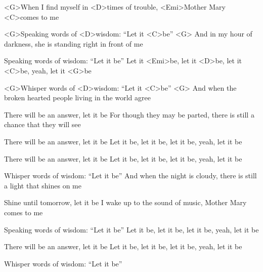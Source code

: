 

\zs
<G>When I find myself in <D>times of trouble,
<Emi>Mother Mary <C>comes to me

<G>Speaking words of <D>wisdom: ``Let it <C>be'' <G>
\ks
\zs
And in my hour of darkness,
she is standing right in front of me

Speaking words of wisdom: ``Let it be''
\ks
\zr
Let it <Emi>be, let it <D>be, let it <C>be, yeah, let it <G>be

<G>Whisper words of <D>wisdom: ``Let it <C>be'' <G>
\kr
\zs
And when the broken hearted people
living in the world agree

There will be an answer, let it be
\ks
\zs
For though they may be parted,
there is still a chance that they will see

There will be an answer, let it be
\ks
\zr
Let it be, let it be, let it be, yeah, let it be

There will be an answer, let it be
\kr
\zr
Let it be, let it be, let it be, yeah, let it be

Whisper words of wisdom: ``Let it be''
\kr
\zs
And when the night is cloudy,
there is still a light that shines on me

Shine until tomorrow, let it be
\ks
\zs
I wake up to the sound of music,
Mother Mary comes to me

Speaking words of wisdom: ``Let it be''
\ks
\zr
Let it be, let it be, let it be, yeah, let it be

There will be an answer, let it be
\kr
\zr
Let it be, let it be, let it be, yeah, let it be

Whisper words of wisdom: ``Let it be''
\kr

\kp
